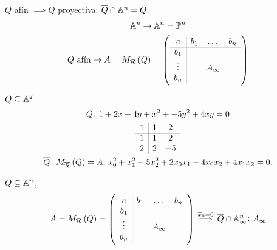 \begin{obs}
    $Q$ afín $\implies Q$ proyectiva: $\overline{Q} \cap \mathbb{A}^n = Q$.
    \begin{gather*}
        \mathbb{A}^n \to \bar{\mathbb{A}}^n = \mathbb{P}^n \\
        Q \text{ afín} \to A = M_{\mathcal{R}}\left( Q \right) =
        \left( \begin{array}{c|ccc}
            c & b_1 & \dots & b_n \\ \hline
            b_1 & & & \\
            \vdots & & A_\infty & \\
            b_n & & & 
        \end{array} \right)
    \end{gather*}
\end{obs}
\begin{example}
    $Q \subseteq \mathbb{A}^2$ \\
    \begin{gather*}
        Q \colon 1+2x+4y+x^2+-5y^2+4xy = 0 \\
        \begin{array}{c|cc}
            1 & 1 & 2 \\ \hline
            1 & 1 & 2 \\
            2 & 2 & -5
        \end{array} \\
        \overline{Q} \colon M_{\overline{\mathcal{R}}}\left( Q \right) = A, \, x_0^2+x_1^2-5x_2^2 + 2x_0x_1 + 4x_0x_2 + 4x_1x_2 = 0.
    \end{gather*}
\end{example}
\begin{obs}
    $Q \subseteq \mathbb{A}^n$,
    \[
        A = M_{\mathcal{R}}\left( Q \right) =
        \left( \begin{array}{c|ccc}
            c & b_1 & \dots & b_n \\
            b_1 & & & \\
            \vdots & & A_\infty & \\
            b_n & & &
        \end{array} \right)
        \stackrel{\overline{x}_0 = 0}{\implies} \overline{Q} \cap \bar{\mathbb{A}}^n_\infty \colon A_\infty
    \]
\end{obs}
